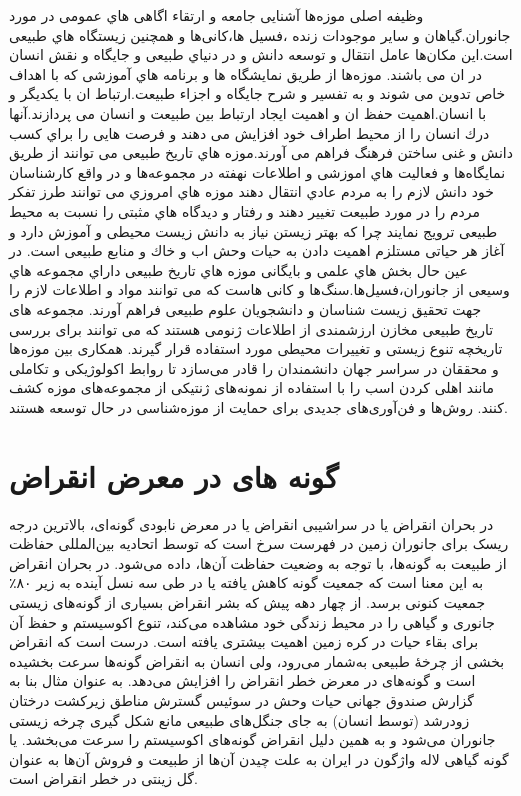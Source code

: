 وظیفه اصلی موزه‌ها آشنایی جامعه و ارتقاء اگاهی هاي عمومی در مورد جانوران.گیاهان و سایر موجودات زنده ،فسیل ها،کانی‌ها و همچنین  
زیستگاه هاي طبیعی است.این مکان‌ها عامل انتقال و توسعه دانش و در دنیاي طبیعی و جایگاه و نقش انسان در ان می باشند. موزه‌ها از طریق  
نمایشگاه ها و برنامه هاي آموزشی که با اهداف خاص تدوین می شوند و به تفسیر و شرح جایگاه و اجزاء طبیعت.ارتباط ان با یکدیگر و با انسان.اهمیت حفظ ان و اهمیت ایجاد ارتباط بین طبیعت و انسان می پردازند.آنها درك انسان را از محیط اطراف خود افزایش می دهند و فرصت هایی را براي کسب دانش و غنی ساختن فرهنگ فراهم می آورند.موزه هاي تاریخ طبیعی می توانند از طریق نمایگاه‌ها و فعالیت هاي اموزشی و اطلاعات نهفته در مجموعه‌ها و در واقع کارشناسان خود دانش لازم را به مردم عادي انتقال دهند موزه هاي امروزي می توانند طرز تفکر مردم را در  
مورد طبیعت تغییر دهند و رفتار و دیدگاه هاي مثبتی را نسبت به محیط طبیعی ترویج نمایند چرا که بهتر زیستن نیاز به دانش زیست محیطی و آموزش دارد و آغاز هر حیاتی مستلزم اهمیت دادن به حیات وحش اب و خاك و منابع طبیعی است. در عین حال بخش هاي علمی و بایگانی موزه هاي تاریخ طبیعی داراي مجموعه هاي وسیعی از جانوران،فسیل‌ها.سنگ‌ها و کانی هاست که می توانند مواد و اطلاعات لازم را جهت تحقیق  
زیست شناسان و دانشجویان علوم طبیعی فراهم آورند.
مجموعه های تاریخ طبیعی مخازن ارزشمندی از اطلاعات ژنومی هستند که می توانند برای بررسی تاریخچه تنوع زیستی و تغییرات محیطی مورد استفاده قرار گیرند. همکاری بین موزه‌ها و محققان در سراسر جهان دانشمندان را قادر می‌سازد تا روابط اکولوژیکی و تکاملی مانند اهلی کردن اسب را با استفاده از نمونه‌های ژنتیکی از مجموعه‌های موزه کشف کنند. روش‌ها و فن‌آوری‌های جدیدی برای حمایت از موزه‌شناسی در حال توسعه هستند.

\section*{گونه های در معرض انقراض}
در بحران انقراض یا در سراشیبی انقراض یا در معرض نابودی گونه‌ای، بالاترین درجه ریسک برای جانوران زمین در فهرست سرخ  است که توسط اتحادیه بین‌المللی حفاظت از طبیعت به گونه‌ها، با توجه به وضعیت حفاظت آن‌ها، داده می‌شود. در بحران انقراض به این معنا است که جمعیت گونه کاهش یافته یا در طی سه نسل آینده به زیر ۸۰٪ جمعیت کنونی برسد.
از چهار دهه پیش که بشر انقراض بسیاری از گونه‌های زیستی جانوری و گیاهی را در محیط زندگی خود مشاهده می‌کند، تنوع اکوسیستم و حفظ آن برای بقاء حیات در کره زمین اهمیت بیشتری یافته است.
درست است که انقراض بخشی از چرخهٔ طبیعی به‌شمار می‌رود، ولی انسان به انقراض گونه‌ها سرعت بخشیده است و گونه‌های در معرض خطر انقراض را افزایش می‌دهد. به عنوان مثال بنا به گزارش صندوق جهانی حیات وحش در سوئیس گسترش مناطق زیرکشت درختان زودرشد (توسط انسان) به جای جنگل‌های طبیعی مانع شکل گیری چرخه زیستی جانوران می‌شود و به همین دلیل انقراض گونه‌های اکوسیستم را سرعت می‌بخشد.
 یا گونه گیاهی لاله واژگون در ایران به علت چیدن آن‌ها از طبیعت و فروش آن‌ها به عنوان گل زینتی در خطر انقراض است.

